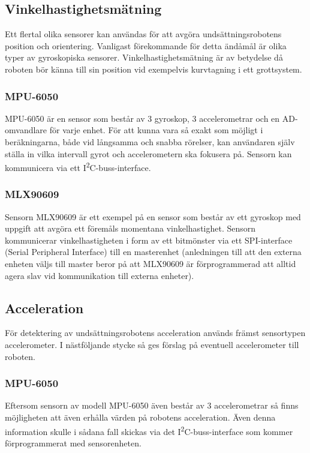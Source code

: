 \documentclass[11pt]{article}
\begin{document}
\begin{flushleft}
\subsection{Vinkelhastighetsmätning}
Ett flertal olika sensorer kan användas för att avgöra undsättningsrobotens position och orientering. Vanligast förekommande för detta ändåmål är olika typer av gyroskopiska sensorer. Vinkelhastighetsmätning är av betydelse då roboten bör känna till sin position vid exempelvis kurvtagning i ett grottsystem.

\subsubsection{MPU-6050}
MPU-6050 är en sensor som består av 3 gyroskop, 3 accelerometrar och en AD-omvandlare för varje enhet. För att kunna vara så exakt som möjligt i beräkningarna, både vid långsamma och snabba rörelser, kan användaren själv ställa in vilka intervall gyrot och accelerometern ska fokusera på. Sensorn kan kommunicera via ett I\textsuperscript{2}C-buss-interface. \cite{MPU}

\subsubsection{MLX90609}
Sensorn MLX90609 är ett exempel på en sensor som består av ett gyroskop med uppgift att avgöra ett föremåls momentana vinkelhastighet. Sensorn kommunicerar vinkelhastigheten i form av ett bitmönster via ett SPI-interface (Serial Peripheral Interface) till en masterenhet (anledningen till att den externa enheten väljs till master beror på att MLX90609 är förprogrammerad att alltid agera slav vid kommunikation till externa enheter). \cite{Melexis}

\subsection{Acceleration}
För detektering av undsättningsrobotens acceleration används främst sensortypen accelerometer. I nästföljande stycke så ges förslag på eventuell accelerometer till roboten.

\subsubsection{MPU-6050}
Eftersom sensorn av modell MPU-6050 även består av 3 accelerometrar så finns möjligheten att även erhålla värden på robotens acceleration. Även denna information skulle i sådana fall skickas via det I\textsuperscript{2}C-buss-interface som kommer förprogrammerat med sensorenheten. \cite{MPU}



\end{flushleft}
\end{document}
